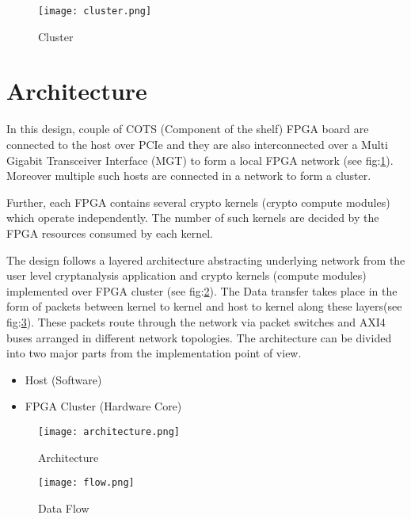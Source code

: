 \documentclass[10pt, conference, compsocconf]{IEEEtran}
\begin{document}
 
\begin{figure}[!htbp]
  \begin{center}
    \texttt{[image: cluster.png]}
    \caption{Cluster}
    \label{fig:Cluster}
  \end{center}
\end{figure}

\section{Architecture}
In this design, couple of COTS (Component of the shelf) FPGA board are connected to the host over PCIe and they are also interconnected over a Multi Gigabit Transceiver Interface (MGT) to form a local FPGA network (see fig:\ref{fig:Cluster}). Moreover multiple such hosts are connected in a network to form a cluster.  

Further, each FPGA contains several crypto kernels (crypto compute modules) which operate independently. The number of such kernels are decided by the FPGA resources consumed by each kernel. 

The design follows a layered architecture abstracting underlying network from the user level cryptanalysis application and crypto kernels (compute modules) implemented over FPGA cluster (see fig:\ref{fig:Arch}). The Data transfer takes place in the form of packets between kernel to kernel and host to kernel along these layers(see fig:\ref{fig:flow}). These packets route through the network via packet switches and AXI4 buses arranged in different network topologies. The architecture can be divided into two major parts from the implementation point of view.

\begin{itemize}
  \item Host (Software)
  \item FPGA Cluster (Hardware Core)
\end{itemize}


\begin{figure}[!htbp]
  \begin{center}
    \texttt{[image: architecture.png]}
    \caption{Architecture}
    \label{fig:Arch}
  \end{center}
\end{figure}


\begin{figure}[!htbp]
  \begin{center}
    \texttt{[image: flow.png]}
    \caption{Data Flow}
    \label{fig:flow}
  \end{center}
\end{figure}
\end{document}
